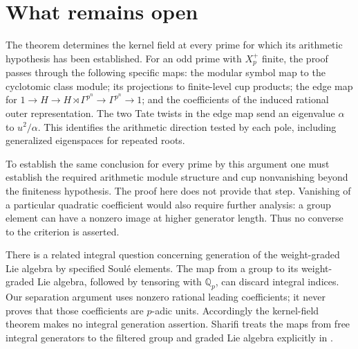 \documentclass[11pt]{article}
\theoremstyle{definition}
\numberwithin{equation}{section}
\begin{document}
\section{What remains open}\label{sec:open}

The theorem determines the kernel field at every prime for which its
arithmetic hypothesis has been established. For an odd prime with
$X_p^+$ finite, the proof passes through the following specific maps:
the modular symbol map to the cyclotomic class module; its projections
to finite-level cup products; the edge map for
$1\to H\to H\rtimes\Gamma^{p^n}\to\Gamma^{p^n}\to1$;
and the coefficients of the induced rational outer representation.
The two Tate twists in the edge map send an eigenvalue $\alpha$ to
$u^2/\alpha$. This identifies the arithmetic direction tested by each
pole, including generalized eigenspaces for repeated roots.

To establish the same conclusion for every prime by this argument one
must establish the required arithmetic module structure and cup
nonvanishing beyond the finiteness hypothesis. The proof here does not
provide that step. Vanishing of a particular quadratic coefficient
would also require further analysis: a group element can have a
nonzero image at higher generator length. Thus no converse to the
criterion is asserted.

There is a related integral question concerning generation of the
weight-graded Lie algebra by specified Soul\'e elements. The map from
a group to its weight-graded Lie algebra, followed by tensoring with
$\mathbb Q_p$, can discard integral indices. Our separation argument
uses nonzero rational leading coefficients; it never proves that those
coefficients are $p$-adic units. Accordingly the kernel-field theorem
makes no integral generation assertion. Sharifi treats the maps from
free integral generators to the filtered group and graded Lie algebra
explicitly in \cite[Sections 1 and 4]{Sharifi2002}.
\end{document}
